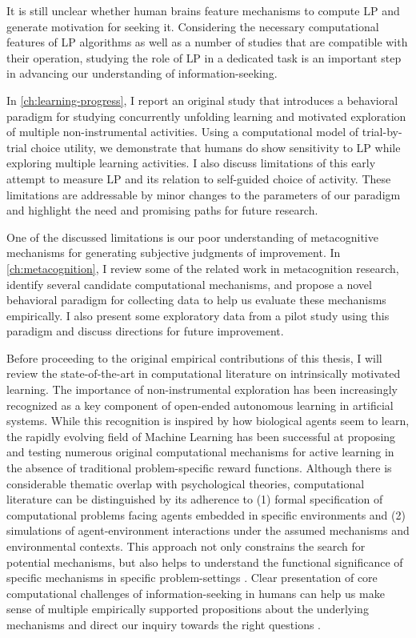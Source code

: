 It is still unclear whether human brains feature mechanisms to compute \ac{LP} and generate motivation for seeking it. Considering the necessary computational features of \ac{LP} algorithms as well as a number of studies that are compatible with their operation, studying the role of \ac{LP} in a dedicated task is an important step in advancing our understanding of information-seeking.

In \autoref{ch:learning-progress}, I report an original study that introduces a behavioral paradigm for studying concurrently unfolding learning and motivated exploration of multiple non-instrumental activities. Using a computational model of trial-by-trial choice utility, we demonstrate that humans do show sensitivity to \ac{LP} while exploring multiple learning activities. I also discuss limitations of this early attempt to measure \ac{LP} and its relation to self-guided choice of activity. These limitations are addressable by minor changes to the parameters of our paradigm and highlight the need and promising paths for future research.

One of the discussed limitations is our poor understanding of metacognitive mechanisms for generating subjective judgments of improvement. In \autoref{ch:metacognition}, I review some of the related work in metacognition research, identify several candidate computational mechanisms, and propose a novel behavioral paradigm for collecting data to help us evaluate these mechanisms empirically. I also present some exploratory data from a pilot study using this paradigm and discuss directions for future improvement.

Before proceeding to the original empirical contributions of this thesis, I will review the state-of-the-art in computational literature on intrinsically motivated learning. The importance of non-instrumental exploration has been increasingly recognized as a key component of open-ended autonomous learning in artificial systems. While this recognition is inspired by how biological agents seem to learn, the rapidly evolving field of Machine Learning has been successful at proposing and testing numerous original computational mechanisms for active learning in the absence of traditional problem-specific reward functions. Although there is considerable thematic overlap with psychological theories, computational literature can be distinguished by its adherence to (1) formal specification of computational problems facing agents embedded in specific environments and (2) simulations of agent-environment interactions under the assumed mechanisms and environmental contexts. This approach not only constrains the search for potential mechanisms, but also helps to understand the functional significance of specific mechanisms in specific problem-settings \cite[e.g., ][]{lopes_strategic_2012,moulin-frier_exploration_2013}. Clear presentation of core computational challenges of information-seeking in humans can help us make sense of multiple empirically supported propositions about the underlying mechanisms \cite{dubey_reconciling_2020,brandle_what_2020} and direct our inquiry towards the right questions \cite{coenen_asking_2019}.